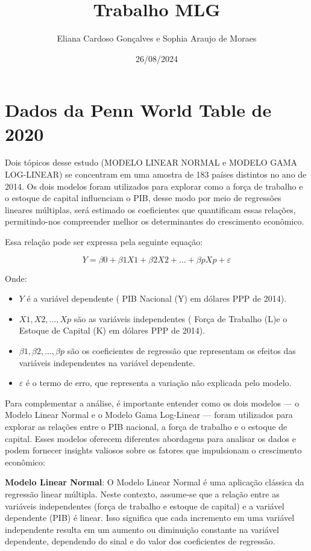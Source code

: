 \documentclass[
  letterpaper,
  DIV=11,
  numbers=noendperiod]{scrreprt}
\title{Trabalho MLG}
\author{Eliana Cardoso Gonçalves e Sophia Araujo de Moraes}
\date{26/08/2024}
\renewcommand*\contentsname{Índice}
\newcommand\contentsname{Índice}
\begin{document}
\maketitle

\renewcommand*\contentsname{Índice}
{
\hypersetup{linkcolor=}
\setcounter{tocdepth}{2}
\tableofcontents
}
\chapter{Dados da Penn World Table de
2020}\label{dados-da-penn-world-table-de-2020}

Dois tópicos desse estudo (MODELO LINEAR NORMAL e MODELO GAMA
LOG-LINEAR) se concentram em uma amostra de 183 países distintos no ano
de 2014. Os dois modelos foram utilizados para explorar como a força de
trabalho e o estoque de capital influenciam o PIB, desse modo por meio
de regressões lineares múltiplas, será estimado os coeficientes que
quantificam essas relações, permitindo-nos compreender melhor os
determinantes do crescimento econômico.

Essa relação pode ser expressa pela seguinte equação:

\[Y=β0+β1X1+β2X2+...+βpXp+ε\]

Onde:

\begin{itemize}
\item
  \(Y\) é a variável dependente ( PIB Nacional (Y) em dólares PPP de
  2014).
\item
  \(X1,X2,...,Xp\) são as variáveis independentes ( Força de Trabalho
  (L)e o Estoque de Capital (K) em dólares PPP de 2014).
\item
  \(β1,β2,...,βp\) são os coeficientes de regressão que representam os
  efeitos das variáveis independentes na variável dependente.
\item
  \(ε\) é o termo de erro, que representa a variação não explicada pelo
  modelo.
\end{itemize}

Para complementar a análise, é importante entender como os dois modelos
--- o Modelo Linear Normal e o Modelo Gama Log-Linear --- foram
utilizados para explorar as relações entre o PIB nacional, a força de
trabalho e o estoque de capital. Esses modelos oferecem diferentes
abordagens para analisar os dados e podem fornecer insights valiosos
sobre os fatores que impulsionam o crescimento econômico:

\textbf{Modelo Linear Normal}: O Modelo Linear Normal é uma aplicação
clássica da regressão linear múltipla. Neste contexto, assume-se que a
relação entre as variáveis independentes (força de trabalho e estoque de
capital) e a variável dependente (PIB) é linear. Isso significa que cada
incremento em uma variável independente resulta em um aumento ou
diminuição constante na variável dependente, dependendo do sinal e do
valor dos coeficientes de regressão.
\end{document}
